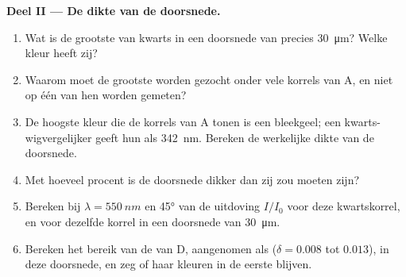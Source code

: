 \begin{problem}
\medskip
\noindent\textbf{Deel II --- De dikte van de doorsnede.}
\begin{enumerate}[resume]
  \item Wat is de grootste  van kwarts in een doorsnede van precies \qty{30}{\micro m}? Welke kleur heeft zij?
  \item Waarom moet de grootste  worden gezocht onder vele korrels van A, en niet op één van hen worden gemeten?
  \item De hoogste kleur die de korrels van A tonen is een  bleekgeel; een kwarts-wigvergelijker geeft hun  als
        \qty{342}{nm}. Bereken de werkelijke dikte van de doorsnede.
  \item Met hoeveel procent is de doorsnede dikker dan zij zou moeten zijn?
  \item Bereken bij $\lambda = \qty{550}{nm}$ en \ang{45} van de uitdoving $I/I_0$ voor deze kwartskorrel, en voor dezelfde korrel in een
        doorsnede van \qty{30}{\micro m}.
  \item Bereken het bereik van de  van D, aangenomen als  ($\delta = 0.008$ tot $0.013$), in deze doorsnede,
        en zeg of haar kleuren in de eerste  blijven.
\end{enumerate}


\end{problem}
